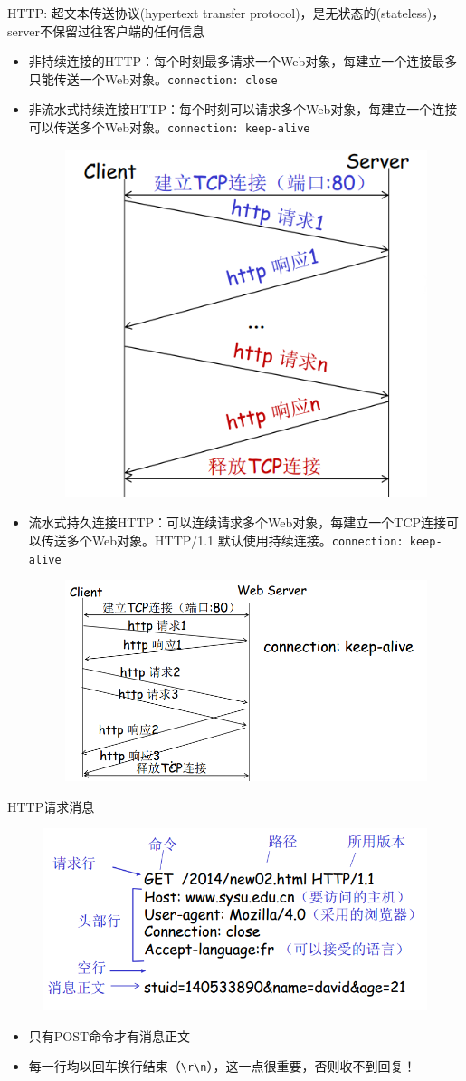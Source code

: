 HTTP: 超文本传送协议(hypertext transfer protocol)，是无状态的(stateless)，server不保留过往客户端的任何信息
\begin{itemize}
\item 非持续连接的HTTP：每个时刻最多请求一个Web对象，每建立一个连接最多只能传送一个Web对象。\verb'connection: close'
\item 非流水式持续连接HTTP：每个时刻可以请求多个Web对象，每建立一个连接可以传送多个Web对象。\verb'connection: keep-alive'
\begin{figure}[H]
    \centering
    \includegraphics[width=0.6\linewidth]{fig/non-pipelining-http.png}
\end{figure}
\item 流水式持久连接HTTP：可以连续请求多个Web对象，每建立一个TCP连接可以传送多个Web对象。HTTP/1.1 默认使用持续连接。\verb'connection: keep-alive'
\begin{figure}[H]
    \centering
    \includegraphics[width=0.6\linewidth]{fig/pipelining-http.png}
\end{figure}
\end{itemize}

HTTP请求消息
\begin{figure}[H]
    \centering
    \includegraphics[width=0.6\linewidth]{fig/http-msg.png}
\end{figure}
\begin{itemize}
\item 只有POST命令才有消息正文
\item 每一行均以回车换行结束（\verb'\r\n'），这一点很重要，否则收不到回复！
\end{itemize}

